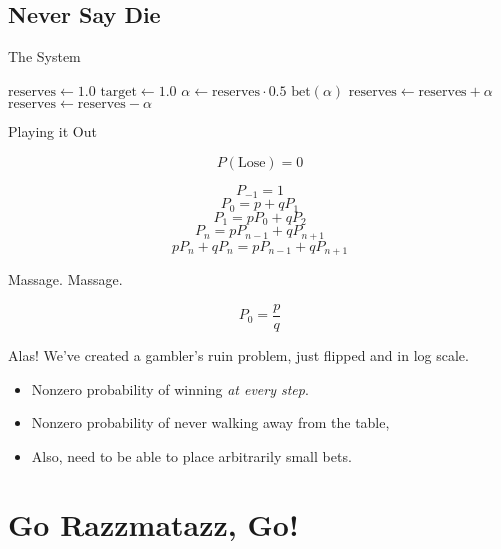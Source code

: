 \documentclass[pdf]{beamer}
\begin{document}
\subsection{Never Say Die}
\begin{frame}{The System}
  \begin{algorithmic}
    \State $\text{reserves} \gets 1.0$
    \State $\text{target} \gets 1.0$
      \State $\alpha \gets \text{reserves} \cdot 0.5$
      \State $\text{bet}(\alpha)$
        \State $\text{reserves} \gets \text{reserves} + \alpha$
      \Else
        \State $\text{reserves} \gets \text{reserves} - \alpha$
      \EndIf
    \EndWhile
    \EndProcedure
  \end{algorithmic}
\end{frame}

\begin{frame}{Playing it Out}

  \[ P(\text{Lose}) = 0 \]

  \pause

  \[ P_{-1} = 1 \]
  \[ P_{0} = p + q P_{1}\]
  \[ P_{1} = p P_{0}  + q P_{2} \]
  \[ P_{n} = p P_{n-1} + qP_{n+1} \]
  \[ pP_{n} + qP_n = p P_{n-1} + qP_{n+1} \]

  \pause
  Massage. Massage.
  
  \pause
  \[ P_0 = \frac{p}{q} \]
  
\end{frame}

\begin{frame}{Alas!}
  We've created a gambler's ruin problem, just flipped and in log scale.

  \begin{itemize}
  \item Nonzero probability of winning \emph{at every step}.
  \item Nonzero probability of never walking away from the table,
  \item Also, need to be able to place arbitrarily small bets.
  \end{itemize}
\end{frame}

\section{Go Razzmatazz, Go!}
\end{document}
